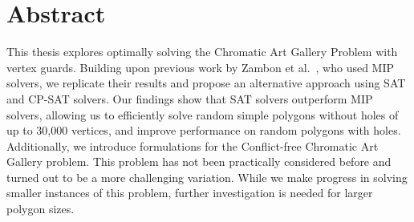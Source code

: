 \chapter*{Abstract}
This thesis explores optimally solving the Chromatic Art Gallery Problem with vertex guards. Building upon previous work by Zambon et al.~\cite{zambon2014exact}, who used MIP solvers, we replicate their results and propose an alternative approach using SAT and CP-SAT solvers. Our findings show that SAT solvers outperform MIP solvers, allowing us to efficiently solve random simple polygons without holes of up to 30,000 vertices, and improve performance on random polygons with holes. Additionally, we introduce formulations for the Conflict-free Chromatic Art Gallery problem. This problem has not been practically considered before and turned out to be a more challenging variation. While we make progress in solving smaller instances of this problem, further investigation is needed for larger polygon sizes.
